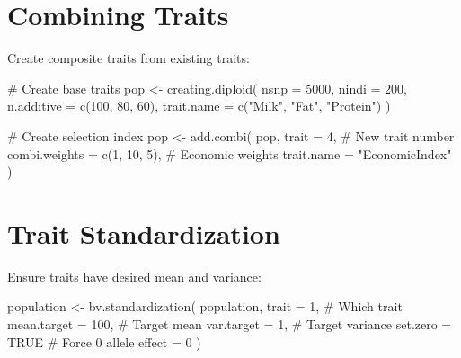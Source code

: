 \documentclass[
  letterpaper,
]{book}
\newenvironment{Shaded}{\begin{snugshade}}{\end{snugshade}}
\newcommand{\AttributeTok}[1]{\textcolor[rgb]{0.40,0.45,0.13}{#1}}
\newcommand{\CommentTok}[1]{\textcolor[rgb]{0.37,0.37,0.37}{#1}}
\newcommand{\ConstantTok}[1]{\textcolor[rgb]{0.56,0.35,0.01}{#1}}
\newcommand{\DecValTok}[1]{\textcolor[rgb]{0.68,0.00,0.00}{#1}}
\newcommand{\FunctionTok}[1]{\textcolor[rgb]{0.28,0.35,0.67}{#1}}
\newcommand{\NormalTok}[1]{\textcolor[rgb]{0.00,0.23,0.31}{#1}}
\newcommand{\OtherTok}[1]{\textcolor[rgb]{0.00,0.23,0.31}{#1}}
\newcommand{\StringTok}[1]{\textcolor[rgb]{0.13,0.47,0.30}{#1}}
\begin{document}
\section{Combining Traits}\label{sec-combine-traits}

Create composite traits from existing traits:

\begin{Shaded}
\begin{Highlighting}[]
\CommentTok{\# Create base traits}
\NormalTok{pop }\OtherTok{\textless{}{-}} \FunctionTok{creating.diploid}\NormalTok{(}
  \AttributeTok{nsnp =} \DecValTok{5000}\NormalTok{, }\AttributeTok{nindi =} \DecValTok{200}\NormalTok{,}
  \AttributeTok{n.additive =} \FunctionTok{c}\NormalTok{(}\DecValTok{100}\NormalTok{, }\DecValTok{80}\NormalTok{, }\DecValTok{60}\NormalTok{),}
  \AttributeTok{trait.name =} \FunctionTok{c}\NormalTok{(}\StringTok{"Milk"}\NormalTok{, }\StringTok{"Fat"}\NormalTok{, }\StringTok{"Protein"}\NormalTok{)}
\NormalTok{)}

\CommentTok{\# Create selection index}
\NormalTok{pop }\OtherTok{\textless{}{-}} \FunctionTok{add.combi}\NormalTok{(}
\NormalTok{  pop,}
  \AttributeTok{trait =} \DecValTok{4}\NormalTok{,  }\CommentTok{\# New trait number}
  \AttributeTok{combi.weights =} \FunctionTok{c}\NormalTok{(}\DecValTok{1}\NormalTok{, }\DecValTok{10}\NormalTok{, }\DecValTok{5}\NormalTok{),  }\CommentTok{\# Economic weights}
  \AttributeTok{trait.name =} \StringTok{"EconomicIndex"}
\NormalTok{)}
\end{Highlighting}
\end{Shaded}

\section{Trait Standardization}\label{sec-standardization}

Ensure traits have desired mean and variance:

\begin{Shaded}
\begin{Highlighting}[]
\NormalTok{population }\OtherTok{\textless{}{-}} \FunctionTok{bv.standardization}\NormalTok{(}
\NormalTok{  population,}
  \AttributeTok{trait =} \DecValTok{1}\NormalTok{,              }\CommentTok{\# Which trait}
  \AttributeTok{mean.target =} \DecValTok{100}\NormalTok{,      }\CommentTok{\# Target mean}
  \AttributeTok{var.target =} \DecValTok{1}\NormalTok{,         }\CommentTok{\# Target variance}
  \AttributeTok{set.zero =} \ConstantTok{TRUE}         \CommentTok{\# Force 0 allele effect = 0}
\NormalTok{)}
\end{Highlighting}
\end{Shaded}
\end{document}
